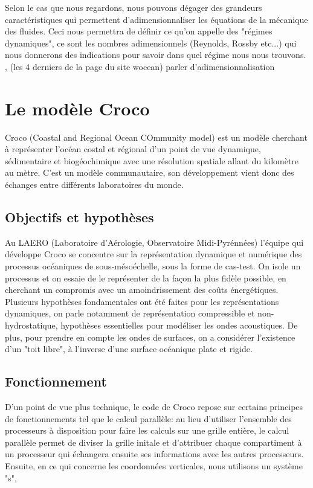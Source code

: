 \documentclass{rapportECC}
\begin{document}
Selon le cas que nous regardons, nous pouvons dégager des grandeurs caractéristiques qui permettent d'adimensionnaliser les équations de la mécanique des fluides. Ceci nous permettra de définir ce qu'on appelle des "régimes dynamiques", ce sont les nombres adimensionnels (Reynolds, Rossby etc...) qui nous donnerons des indications pour savoir dans quel régime nous nous trouvons.
, (les 4 derniers de la page du site wocean)
parler d'adimensionnalisation

\section{Le modèle Croco}
Croco (Coastal and Regional Ocean COmmunity model) est un modèle cherchant à représenter l'océan costal et régional d'un point de vue dynamique, sédimentaire et biogéochimique avec une résolution spatiale allant du kilomètre au mètre. C'est un modèle communautaire, son développement vient donc des échanges entre différents laboratoires du monde. \\


\subsection{Objectifs et hypothèses}
Au LAERO (Laboratoire d'Aérologie, Observatoire Midi-Pyrénnées) l'équipe qui développe Croco se concentre sur la représentation dynamique et numérique des processus océaniques de sous-mésoéchelle, sous la forme de cas-test. On isole un processus et on essaie de le représenter de la façon la plus fidèle possible, en cherchant un compromis avec un amoindrissement des coûts énergétiques. \\
Plusieurs hypothèses fondamentales ont été faites pour les représentations dynamiques, on parle notamment de représentation compressible et non-hydrostatique, hypothèses essentielles pour modéliser les ondes acoustiques. De plus, pour prendre en compte les ondes de surfaces, on a considérer l'existence d'un "toit libre", à l'inverse d'une surface océanique plate et rigide.



\subsection{Fonctionnement}
D'un point de vue plus technique, le code de Croco repose sur certains principes de fonctionnements tel que le calcul parallèle: au lieu d'utiliser l'ensemble des processeurs à disposition pour faire les calculs sur une grille entière, le calcul parallèle permet de diviser la grille initale et d'attribuer chaque compartiment à un processeur qui échangera ensuite ses informations avec les autres processeurs. \\
Ensuite, en ce qui concerne les coordonnées verticales, nous utilisons un système "s", 
\end{document}
